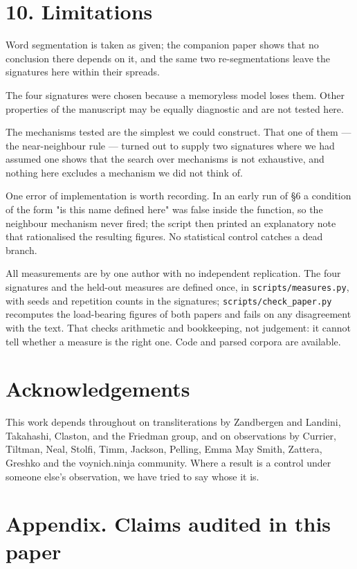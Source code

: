 \documentclass[11pt,a4paper]{article}
\begin{document}
\section*{10. Limitations}


Word segmentation is taken as given; the companion paper shows that no conclusion there depends on it, and the same two re-segmentations leave the signatures here within their spreads.


The four signatures were chosen because a memoryless model loses them. Other properties of the manuscript may be equally diagnostic and are not tested here.


The mechanisms tested are the simplest we could construct. That one of them --- the near-neighbour rule --- turned out to supply two signatures where we had assumed one shows that the search over mechanisms is not exhaustive, and nothing here excludes a mechanism we did not think of.


One error of implementation is worth recording. In an early run of \S6 a condition of the form "is this name defined here" was false inside the function, so the neighbour mechanism never fired; the script then printed an explanatory note that rationalised the resulting figures. No statistical control catches a dead branch.


All measurements are by one author with no independent replication. The four signatures and the held-out measures are defined once, in \texttt{scripts/measures.py}, with seeds and repetition counts in the signatures; \texttt{scripts/check\_paper.py} recomputes the load-bearing figures of both papers and fails on any disagreement with the text. That checks arithmetic and bookkeeping, not judgement: it cannot tell whether a measure is the right one. Code and parsed corpora are available.


\section*{Acknowledgements}


This work depends throughout on transliterations by Zandbergen and Landini, Takahashi, Claston, and the Friedman group, and on observations by Currier, Tiltman, Neal, Stolfi, Timm, Jackson, Pelling, Emma May Smith, Zattera, Greshko and the voynich.ninja community. Where a result is a control under someone else's observation, we have tried to say whose it is.


\section*{Appendix. Claims audited in this paper}
\end{document}
